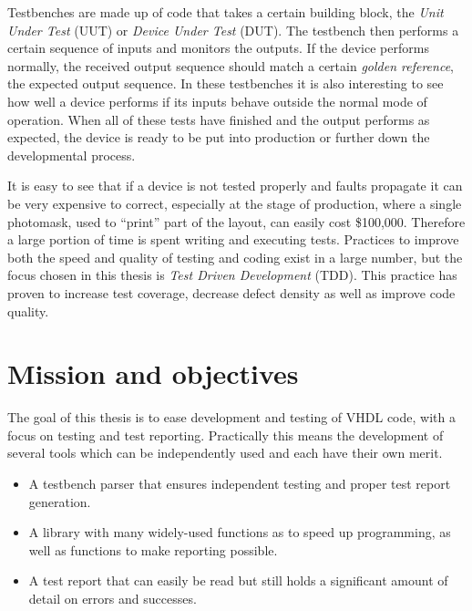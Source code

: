 \documentclass[11pt,british]{article}
\begin{document}
Testbenches are made up of code that takes a certain building block,
the \emph{Unit Under Test} (UUT) or \emph{Device Under Test} (DUT).
The testbench then performs a certain sequence of inputs and monitors
the outputs. If the device performs normally, the received output
sequence should match a certain \emph{golden reference}, the expected
output sequence. In these testbenches it is also interesting to see
how well a device performs if its inputs behave outside the normal
mode of operation. When all of these tests have finished and the output
performs as expected, the device is ready to be put into production
or further down the developmental process.

It is easy to see that if a device is not tested properly and faults
propagate it can be very expensive to correct, especially at the stage
of production, where a single photomask, used to ``print'' part
of the layout, can easily cost \$100,000\cite{key-3}. Therefore a
large portion of time is spent writing and executing tests\cite{key-4}.
Practices to improve both the speed and quality of testing and coding
exist in a large number, but the focus chosen in this thesis is \emph{Test
Driven Development} (TDD). This practice has proven to increase test
coverage\cite{key-5}, decrease defect density\cite{key-8} as well
as improve code quality\cite{key-9,key-8}.


\section{Mission and objectives}

The goal of this thesis is to ease development and testing of VHDL
code, with a focus on testing and test reporting. Practically this
means the development of several tools which can be independently
used and each have their own merit.
\begin{itemize}
\item A testbench parser that ensures independent testing and proper test
report generation.
\item A library with many widely-used functions as to speed up programming,
as well as functions to make reporting possible.
\item A test report that can easily be read but still holds a significant
amount of detail on errors and successes.\end{itemize}
\end{document}

